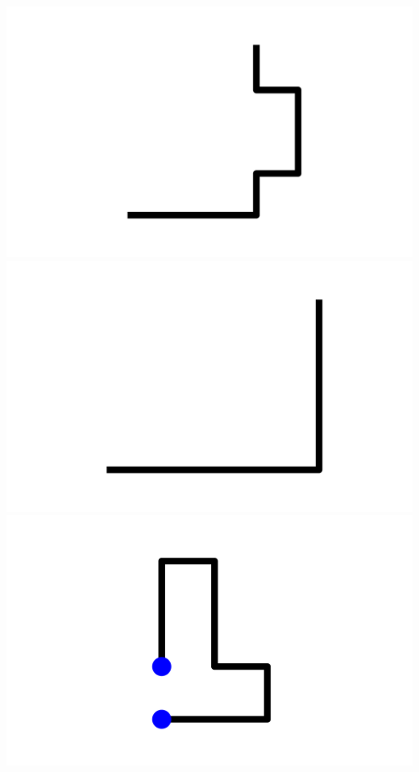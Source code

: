 \documentclass[]{report}
\begin{document}
\includegraphics[scale=.1]{pictures/21/state_cluster_shapes_253.pdf} 
\includegraphics[scale=.1]{pictures/21/state_cluster_shapes_254.pdf} 
\includegraphics[scale=.1]{pictures/21/state_cluster_shapes_255.pdf} 
\end{document}
